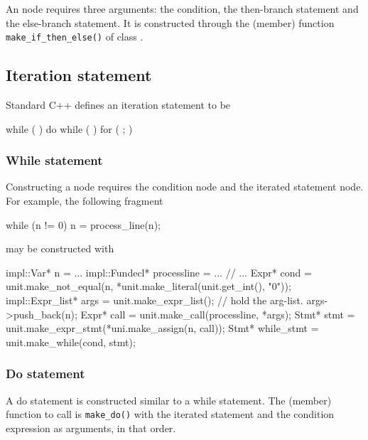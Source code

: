 \documentclass[11pt]{article}
\begin{document}
An  node requires three arguments: the
condition, the then-branch statement and the else-branch statement.  It is
constructed through the (member) function \texttt{make\_if\_then\_else()} of
class .

\subsection{Iteration statement}
\label{sec:stmt.iteration}

Standard C++ defines an iteration statement to be 
\begin{Grammar}
      while (  ) 
      do  while (  )
      for (   ;  ) 
\end{Grammar}


\subsubsection{While statement}
\label{sec:stmt.iteration.while}

Constructing a  node requires the condition node and
the iterated statement node.  For example, the following fragment
\begin{Program}
  while (n != 0)
     n = process_line(n);
\end{Program}
may be constructed with
\begin{Program}
  impl::Var* n = ...
  impl::Fundecl* processline = ...
  // ...
  Expr* cond = unit.make_not_equal(n, *unit.make_literal(unit.get_int(), "0"));
  impl::Expr_list* args = unit.make_expr_list(); // hold the arg-list.
  args->push_back(n);  
  Expr* call = unit.make_call(processline, *args);
  Stmt* stmt = unit.make_expr_stmt(*uni.make_assign(n, call));
  Stmt* while_stmt = unit.make_while(cond, stmt);
\end{Program}


\subsubsection{Do statement}

A do statement is constructed similar to a while statement.  The
(member) function to call is \texttt{make\_do()} with the
iterated statement and the condition expression as arguments, in that order. 
\end{document}
